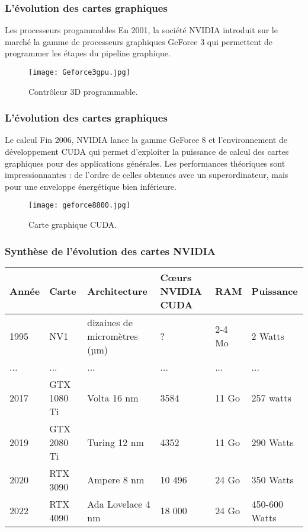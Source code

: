 \begin{frame}
  \frametitle{L'évolution des cartes graphiques}
\begin{block}{Les processeurs progammables}
    En 2001, la société NVIDIA introduit sur le marché la gamme de processeurs graphiques
    GeForce 3 qui permettent de programmer les étapes du pipeline graphique. 
    \begin{figure}[htbp]
        \centering
       \texttt{[image: Geforce3gpu.jpg]} 
        \caption{Contrôleur 3D programmable.}
        \label{fig:geforce3}
    \end{figure}
\end{block}
\end{frame}

\begin{frame}
  \frametitle{L'évolution des cartes graphiques}
\begin{block}{Le calcul}
    Fin 2006, NVIDIA lance la gamme GeForce 8 et l'environnement de développement CUDA qui
    permet d'exploiter la puissance de calcul des cartes graphiques pour des applications générales.
    Les performances théoriques sont impressionnantes : de l'ordre de celles obtenues avec un 
    superordinateur, mais  pour une enveloppe énergétique bien inférieure.

    \begin{figure}[htbp]
        \centering
       \texttt{[image: geforce8800.jpg]} 
        \caption{Carte graphique CUDA.}
        \label{fig:gforce8}
    \end{figure}
\end{block}
\end{frame}

\begin{frame}
  \frametitle{Synthèse de l'évolution des cartes NVIDIA}
{\small  
\hspace{-1cm}
            \begin{tabular}{p{1cm}p{1.5cm}p{3.5cm}p{1cm}p{1cm}p{1cm}}
            \rowcolor{lightgray}\textbf{Année} & \textbf{Carte} & \textbf{Architecture} & \textbf{Cœurs NVIDIA CUDA} & \textbf{RAM} & \textbf{Puissance} \\\hline
            1995 & NV1 & dizaines de micromètres (µm) & ?  & 2-4 Mo & 2 Watts \\
            ... & ... & ...  & ... & ... & ...\\
    
            2017 & GTX 1080 Ti & Volta 16 nm & 3584 & 11 Go & 257 watts \\
            2019 & GTX 2080 Ti & Turing 12 nm & 4352 & 11 Go & 290 Watts \\
            2020 & RTX 3090 & Ampere 8 nm & 10 496 & 24 Go & 350 Watts \\
            2022 & RTX 4090 & Ada Lovelace 4 nm & 18 000  & 24 Go & 450-600 Watts \\            
        \end{tabular}}
\end{frame}

